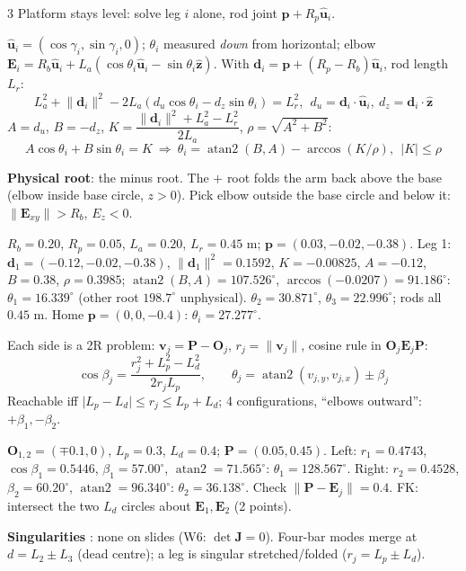 \begin{multicols}{3}
Platform stays level: solve leg $i$ alone, rod joint $\mathbf p+R_p\hat{\mathbf u}_i$.
\begin{deriv}[leg $i$, $\gamma_i=0^\circ,120^\circ,240^\circ$]
$\hat{\mathbf u}_i=(\cos\gamma_i,\sin\gamma_i,0)$; $\theta_i$ measured \emph{down} from horizontal; elbow $\mathbf E_i=R_b\hat{\mathbf u}_i+L_a(\cos\theta_i\hat{\mathbf u}_i-\sin\theta_i\hat{\mathbf z})$. With $\mathbf d_i=\mathbf p+(R_p-R_b)\hat{\mathbf u}_i$, rod length $L_r$:
\[L_a^2+\lVert\mathbf d_i\rVert^2-2L_a(d_u\cos\theta_i-d_z\sin\theta_i)=L_r^2,\ \ d_u=\mathbf d_i\!\cdot\!\hat{\mathbf u}_i,\ d_z=\mathbf d_i\!\cdot\!\hat{\mathbf z}\]
$A=d_u$, $B=-d_z$, $K=\dfrac{\lVert\mathbf d_i\rVert^2+L_a^2-L_r^2}{2L_a}$, $\rho=\sqrt{A^2+B^2}$:
\[A\cos\theta_i+B\sin\theta_i=K\ \Rightarrow\ \theta_i=\operatorname{atan2}(B,A)-\arccos(K/\rho),\ \ \lvert K\rvert\le\rho\]
\end{deriv}
\textbf{Physical root}: the minus root. The $+$ root folds the arm back above the base (elbow inside base circle, $z>0$). Pick elbow outside the base circle and below it: $\lVert\mathbf E_{xy}\rVert>R_b$, $E_z<0$.
\begin{worked}
$R_b=0.20$, $R_p=0.05$, $L_a=0.20$, $L_r=0.45$ m; $\mathbf p=(0.03,-0.02,-0.38)$. Leg 1: $\mathbf d_1=(-0.12,-0.02,-0.38)$, $\lVert\mathbf d_1\rVert^2=0.1592$, $K=-0.00825$, $A=-0.12$, $B=0.38$, $\rho=0.3985$; $\operatorname{atan2}(B,A)=107.526^\circ$, $\arccos(-0.0207)=91.186^\circ$: $\theta_1=16.339^\circ$ (other root $198.7^\circ$ unphysical). $\theta_2=30.871^\circ$, $\theta_3=22.996^\circ$; rods all $0.45$ m. Home $\mathbf p=(0,0,-0.4)$: $\theta_i=27.277^\circ$. \chk
\end{worked}

Each side is a 2R problem: $\mathbf v_j=\mathbf P-\mathbf O_j$, $r_j=\lVert\mathbf v_j\rVert$, cosine rule in $\mathbf O_j\mathbf E_j\mathbf P$:
\[\cos\beta_j=\frac{r_j^2+L_p^2-L_d^2}{2r_jL_p},\qquad\theta_j=\operatorname{atan2}(v_{j,y},v_{j,x})\pm\beta_j\]
Reachable iff $\lvert L_p-L_d\rvert\le r_j\le L_p+L_d$; 4 configurations, ``elbows outward'': $+\beta_1,-\beta_2$.
\begin{worked}
$\mathbf O_{1,2}=(\mp0.1,0)$, $L_p=0.3$, $L_d=0.4$; $\mathbf P=(0.05,0.45)$. Left: $r_1=0.4743$, $\cos\beta_1=0.5446$, $\beta_1=57.00^\circ$, $\operatorname{atan2}=71.565^\circ$: $\theta_1=128.567^\circ$. Right: $r_2=0.4528$, $\beta_2=60.20^\circ$, $\operatorname{atan2}=96.340^\circ$: $\theta_2=36.138^\circ$. Check $\lVert\mathbf P-\mathbf E_j\rVert=0.4$. FK: intersect the two $L_d$ circles about $\mathbf E_1,\mathbf E_2$ (2 points). \chk
\end{worked}
\textbf{Singularities} \added: none on slides (W6: $\det\mathbf J=0$). Four-bar modes merge at $d=L_2\pm L_3$ (dead centre); a leg is singular stretched/folded ($r_j=L_p\pm L_d$).


\end{multicols}
